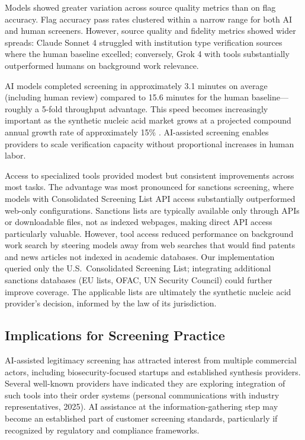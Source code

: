 \documentclass[12pt]{article}
\begin{document}
Models showed greater variation across source quality metrics than on flag accuracy. Flag accuracy pass rates clustered within a narrow range for both AI and human screeners. However, source quality and fidelity metrics showed wider spreads: Claude Sonnet 4 struggled with institution type verification sources where the human baseline excelled; conversely, Grok 4 with tools substantially outperformed humans on background work relevance.

AI models completed screening in approximately 3.1 minutes on average (including human review) compared to 15.6 minutes for the human baseline—roughly a 5-fold throughput advantage. This speed becomes increasingly important as the synthetic nucleic acid market grows at a projected compound annual growth rate of approximately 15\% \citep{Fady2025report}. AI-assisted screening enables providers to scale verification capacity without proportional increases in human labor.

Access to specialized tools provided modest but consistent improvements across most tasks. The advantage was most pronounced for sanctions screening, where models with Consolidated Screening List API access substantially outperformed web-only configurations. Sanctions lists are typically available only through APIs or downloadable files, not as indexed webpages, making direct API access particularly valuable. However, tool access reduced performance on background work search by steering models away from web searches that would find patents and news articles not indexed in academic databases. Our implementation queried only the U.S.\ Consolidated Screening List; integrating additional sanctions databases (EU lists, OFAC, UN Security Council) could further improve coverage. The applicable lists are ultimately the synthetic nucleic acid provider's decision, informed by the law of its jurisdiction.

\subsection{Implications for Screening Practice}

AI-assisted legitimacy screening has attracted interest from multiple commercial actors, including biosecurity-focused startups \citep{Aclid2025, TwentyTwo2026} and established synthesis providers. Several well-known providers have indicated they are exploring integration of such tools into their order systems (personal communications with industry representatives, 2025). AI assistance at the information-gathering step may become an established part of customer screening standards, particularly if recognized by regulatory and compliance frameworks.
\end{document}
